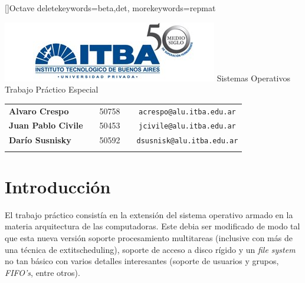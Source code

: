 \documentclass[a4paper,10pt]{article}
\begin{document}
\renewcommand{\lstlistingname}{C\'odigo Fuente}
[]{Octave}{
	deletekeywords={beta,det},
	morekeywords={repmat}
} 
\begin{titlepage}
        \thispagestyle{empty}
        \begin{center}
                \includegraphics{./images/itba.jpg}
                \vfill
                \Huge{Sistemas Operativos}\\
                \vspace{1cm}
                \huge{Trabajo Práctico Especial}\\
        \end{center}
        \vspace{2cm}
        \large{
                \begin{tabular}{lcrc}
                        \textbf{Alvaro Crespo} & & 50758 & \ \ \texttt{acrespo@alu.itba.edu.ar}\\
                        \textbf{Juan Pablo Civile} & & 50453 & \ \ \texttt{jcivile@alu.itba.edu.ar}\\
                        \textbf{Darío Susnisky} & & 50592 & \ \ \texttt{dsusnisk@alu.itba.edu.ar}\\
                        \\ 
                \end{tabular}
        }
        \vfill
\end{titlepage}

\setcounter{page}{1}

\tableofcontents
\newpage
\section{Introducción}
El trabajo práctico consistía en la extensión del sistema operativo armado en la materia arquitectura de las 
computadoras. Este debia ser modificado de modo tal que esta nueva versión soporte procesamiento multitareas
 (inclusive con más de una técnica de 	extit{scheduling}), soporte de acceso a disco rígido y un \textit{file system}
 no tan básico con varios detalles interesantes (soporte de usuarios y grupos, \textit{FIFO's}, entre otros).
\end{document}
